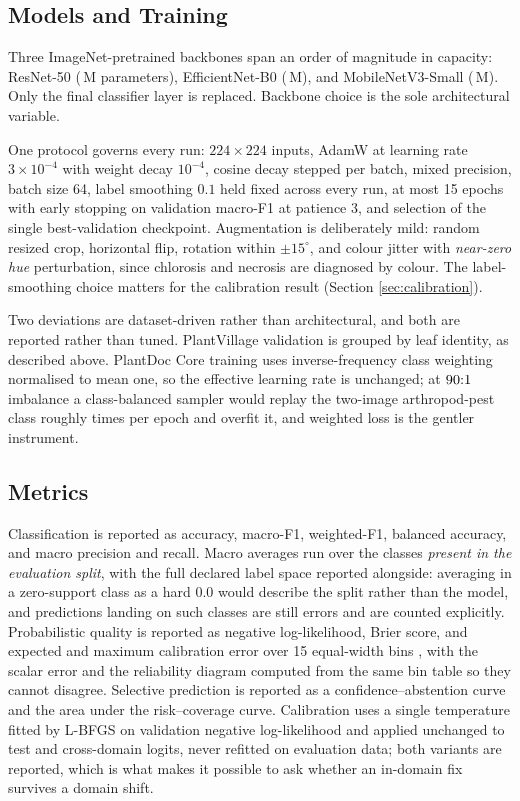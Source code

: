 \documentclass[runningheads]{llncs}
\begin{document}
\subsection{Models and Training}

Three ImageNet-pretrained \cite{deng2009imagenet} backbones span an order of
magnitude in capacity: ResNet-50 \cite{he2016resnet} (\ParamsRn{}\,M
parameters), EfficientNet-B0 \cite{tan2019efficientnet} (\ParamsEb{}\,M), and
MobileNetV3-Small \cite{howard2019mobilenetv3} (\ParamsMn{}\,M). Only the final
classifier layer is replaced. Backbone choice is the sole architectural
variable.

One protocol governs every run: $224 \times 224$ inputs, AdamW at learning rate
$3\times10^{-4}$ with weight decay $10^{-4}$, cosine decay stepped per batch,
mixed precision, batch size 64, label smoothing $0.1$ held fixed across every
run, at most 15 epochs with early stopping on validation macro-F1 at patience 3,
and selection of the single best-validation checkpoint. Augmentation is
deliberately mild: random resized crop, horizontal flip, rotation within
$\pm15^{\circ}$, and colour jitter with \emph{near-zero hue} perturbation, since
chlorosis and necrosis are diagnosed by colour. The label-smoothing choice
matters for the calibration result (Section \ref{sec:calibration}).

Two deviations are dataset-driven rather than architectural, and both are
reported rather than tuned. PlantVillage validation is grouped by leaf identity,
as described above. PlantDoc Core training uses inverse-frequency class weighting
normalised to mean one, so the effective learning rate is unchanged; at
$90{}{:}1$ imbalance a class-balanced sampler would replay the
two-image arthropod-pest class roughly \PdcImbalance{} times per epoch and
overfit it, and weighted loss is the gentler instrument.

\subsection{Metrics}

Classification is reported as accuracy, macro-F1, weighted-F1, balanced
accuracy, and macro precision and recall. Macro averages run over the classes
\emph{present in the evaluation split}, with the full declared label space
reported alongside: averaging in a zero-support class as a hard $0.0$ would
describe the split rather than the model, and predictions landing on such classes
are still errors and are counted explicitly. Probabilistic quality is reported as
negative log-likelihood, Brier score, and expected and maximum calibration error
over 15 equal-width bins \cite{naeini2015ece}, with the scalar error and the
reliability diagram computed from the same bin table so they cannot disagree.
Selective prediction \cite{geifman2017selective} is reported as a
confidence--abstention curve and the area under the risk--coverage curve.
Calibration uses a single temperature fitted by L-BFGS on validation negative
log-likelihood and applied unchanged to test and cross-domain logits, never
refitted on evaluation data; both variants are reported, which is what makes it
possible to ask whether an in-domain fix survives a domain shift.
\end{document}
